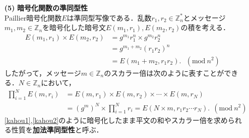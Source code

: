 \documentclass[a4paper]{jsarticle}
\begin{document}
\begin{enumerate}
\item[\textbf{(5)}]\textbf{暗号化関数の準同型性}\\
Paillier暗号化関数$E$は準同型写像である．乱数$r_1, r_2\in\mathbb{Z}^{*}_n$とメッセージ$m_1, m_2\in\mathbb{Z}_{n}$を暗号化した暗号文$E(m_1,r_1),E(m_2,r_2)$の積を考える．
\begin{align*}
\label{kahou1}
E(m_1,r_1)\times E(m_2,r_2)&=g^{m_1}r_1^n\times g^{m_2}r_2^n\\
&=g^{m_1+m_2}(r_1r_2)^n&\\
&=E(m_1+m_2, r_1r_2).\ \ \ (\mathrm{mod}\  n^2)&\tag*{(10)}
\end{align*}
したがって，メッセージ$m\in\mathbb{Z}_{n}$のスカラー倍は次のように表すことができる．$N\in\mathbb{Z}_n$において，
\begin{align*}
\label{kahou2}
\prod_{i = 1}^{N}E(m,r_i)&=E(m,r_1)\times E(m,r_2)\times \cdots \times E(m,r_N)&\\ 
&=(g^{m})^N\times \prod_{i=1}^{N} r_i=E(N\times m, r_1r_2\cdots r_N).\ \ (\mathrm{mod}\  n^2)&\tag*{(11)}
\end{align*}
\ref{kahou1},\ref{kahou2}のように暗号化したまま平文の和やスカラー倍を求められる性質を\textbf{加法準同型性}と呼ぶ．
\end{enumerate}
\end{document}

